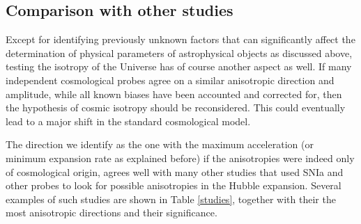 \documentclass{aa}   %
\begin{document}
\subsection{Comparison with other studies}\label{other_studies}

Except for identifying previously unknown factors that can significantly affect the determination of physical parameters of astrophysical objects as discussed above, testing the isotropy of the Universe has of course another aspect as well. If many independent cosmological probes agree on a similar anisotropic direction and amplitude, while all known biases have been accounted and corrected for, then the hypothesis of cosmic isotropy should be reconsidered. This could eventually lead to a major shift in the standard cosmological model. 

The direction we identify as the one with the maximum acceleration (or minimum expansion rate as explained before) if the anisotropies were indeed only of cosmological origin, agrees well with many other studies that used SNIa and other probes to look for possible anisotropies in the Hubble expansion. Several examples of such studies are shown in Table \ref{studies}, together with their the most anisotropic directions and their significance.
\end{document}
